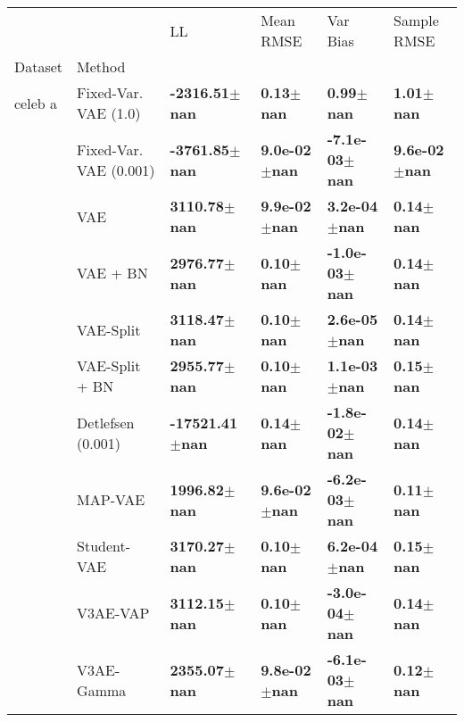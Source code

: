 \begin{tabular}{llllll}
\toprule
             &            &                           LL &                     Mean RMSE &                      Var Bias &                   Sample RMSE \\
Dataset & Method &                              &                               &                               &                               \\
\midrule
celeb a & Fixed-Var. VAE (1.0) &    \textbf{-2316.51$\pm$nan} &         \textbf{0.13$\pm$nan} &         \textbf{0.99$\pm$nan} &         \textbf{1.01$\pm$nan} \\
             & Fixed-Var. VAE (0.001) &    \textbf{-3761.85$\pm$nan} &      \textbf{9.0e-02$\pm$nan} &     \textbf{-7.1e-03$\pm$nan} &      \textbf{9.6e-02$\pm$nan} \\
             & VAE &     \textbf{3110.78$\pm$nan} &      \textbf{9.9e-02$\pm$nan} &      \textbf{3.2e-04$\pm$nan} &         \textbf{0.14$\pm$nan} \\
             & VAE + BN &     \textbf{2976.77$\pm$nan} &         \textbf{0.10$\pm$nan} &     \textbf{-1.0e-03$\pm$nan} &         \textbf{0.14$\pm$nan} \\
             & VAE-Split &     \textbf{3118.47$\pm$nan} &         \textbf{0.10$\pm$nan} &      \textbf{2.6e-05$\pm$nan} &         \textbf{0.14$\pm$nan} \\
             & VAE-Split + BN &     \textbf{2955.77$\pm$nan} &         \textbf{0.10$\pm$nan} &      \textbf{1.1e-03$\pm$nan} &         \textbf{0.15$\pm$nan} \\
             & Detlefsen (0.001) &   \textbf{-17521.41$\pm$nan} &         \textbf{0.14$\pm$nan} &     \textbf{-1.8e-02$\pm$nan} &         \textbf{0.14$\pm$nan} \\
             & MAP-VAE &     \textbf{1996.82$\pm$nan} &      \textbf{9.6e-02$\pm$nan} &     \textbf{-6.2e-03$\pm$nan} &         \textbf{0.11$\pm$nan} \\
             & Student-VAE &     \textbf{3170.27$\pm$nan} &         \textbf{0.10$\pm$nan} &      \textbf{6.2e-04$\pm$nan} &         \textbf{0.15$\pm$nan} \\
             & V3AE-VAP &     \textbf{3112.15$\pm$nan} &         \textbf{0.10$\pm$nan} &     \textbf{-3.0e-04$\pm$nan} &         \textbf{0.14$\pm$nan} \\
             & V3AE-Gamma &     \textbf{2355.07$\pm$nan} &      \textbf{9.8e-02$\pm$nan} &     \textbf{-6.1e-03$\pm$nan} &         \textbf{0.12$\pm$nan} \\

\end{tabular}
